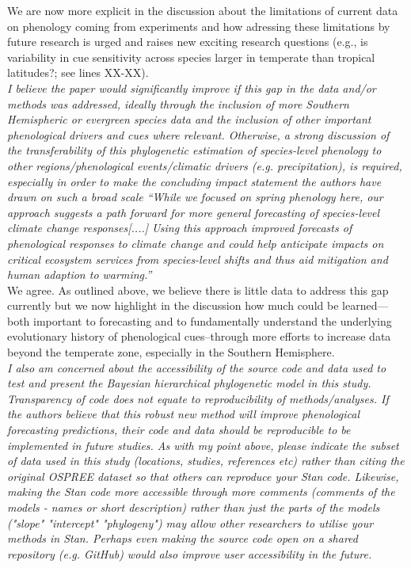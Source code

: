 \documentclass[11pt]{article}
\begin{document}
We are now more explicit in the discussion about the limitations of current data on phenology coming from experiments and how adressing these limitations by future research is urged and raises new exciting research questions (e.g., is variability in cue sensitivity across species larger in temperate than tropical latitudes?; see lines XX-XX). \\


\emph{I believe the paper would significantly improve if this gap in the data and/or methods was addressed, ideally through the inclusion of more Southern Hemispheric or evergreen species data and the inclusion of other important phenological drivers and cues where relevant. Otherwise, a strong discussion of the transferability of this phylogenetic estimation of species-level phenology to other regions/phenological events/climatic drivers (e.g. precipitation), is required, especially in order to make the concluding impact statement the authors have drawn on such a broad scale “While we focused on spring phenology here, our approach suggests a path forward for more general forecasting of species-level climate change responses[....] Using this approach improved forecasts of phenological responses to climate change and could help anticipate impacts on critical ecosystem services from species-level shifts and thus aid mitigation and human adaption to warming.”}\\

We agree. As outlined above, we believe there is little data to address this gap currently but we now highlight in the discussion how much could be learned---both important to forecasting and to fundamentally understand the underlying evolutionary history of phenological cues--through more efforts to increase data beyond the temperate zone, especially in the Southern Hemisphere. \\

\emph{I also am concerned about the accessibility of the source code and data used to test and present the Bayesian hierarchical phylogenetic model in this study. Transparency of code does not equate to reproducibility of methods/analyses. If the authors believe that this robust new method will improve phenological forecasting predictions, their code and data should be reproducible to be implemented in future studies. As with my point above, please indicate the subset of data used in this study (locations, studies, references etc) rather than citing the original OSPREE dataset so that others can reproduce your Stan code. Likewise, making the Stan code more accessible through more comments (comments of the models - names or short description) rather than just the parts of the models ("slope" "intercept" "phylogeny") may allow other researchers to utilise your methods in Stan. Perhaps even making the source code open on a shared repository (e.g. GitHub) would also improve user accessibility in the future.}\\
\end{document}
